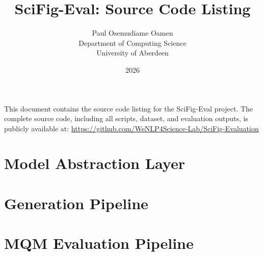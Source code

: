 \documentclass[a4paper,10pt]{article}
\title{SciFig-Eval: Source Code Listing}
\author{Paul Osemudiame Oamen\\Department of Computing Science\\University of Aberdeen}
\date{2026}
\begin{document}
\maketitle

\noindent
This document contains the source code listing for the SciFig-Eval project.
The complete source code, including all scripts, dataset, and evaluation outputs,
is publicly available at:
\url{https://github.com/WeNLP4Science-Lab/SciFig-Evaluation}

\tableofcontents
\lstlistoflistings
\newpage

\section{Model Abstraction Layer}





\section{Generation Pipeline}





\section{MQM Evaluation Pipeline}


\end{document}
